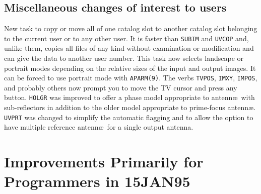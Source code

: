 \subsection{Miscellaneous changes of interest to users}

\begin{description}
 New task to copy or move all of one catalog slot to
   another catalog slot belonging to the current user or to any other
   user.  It is faster than {\tt SUBIM} and {\tt UVCOP} and, unlike
   them, copies all files of any kind without examination or
   modification and can give the data to another user number.
 This task now selects landscape or portrait modes
   depending on the relative sizes of the input and output images.  It
   can be forced to use portrait mode with \hbox{{\tt APARM(9)}}.
 The verbs {\tt TVPOS}, {\tt IMXY}, {\tt IMPOS},
   and probably others now prompt you to move the TV cursor and press
   any button.
 {\tt HOLGR} was improved to offer a phase model
   appropriate to antenn\ae\ with sub-reflectors in addition to the
   older model appropriate to prime-focus antenn\ae.  {\tt UVPRT} was
   changed to simplify the automatic flagging and to allow the option
   to have multiple reference antenn\ae\ for a single output antenna.
\end{description}

\section{Improvements Primarily for Programmers in 15JAN95}

